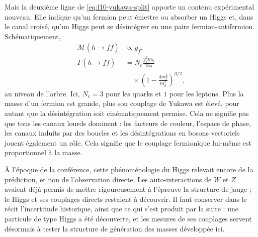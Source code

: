 Mais la deuxième ligne de \eqref{eq:l10-yukawa-split} apporte un contenu expérimental nouveau. Elle indique qu’un fermion peut émettre ou absorber un Higgs et, dans le canal croisé, qu’un Higgs peut se désintégrer en une paire fermion-antifermion. Schématiquement, \begin{equation}
\begin{aligned}
  \mathcal M(h\to f\bar f)&\propto y_f,
  \\
  \Gamma(h\to f\bar f)
  &=
  N_c\frac{y_f^2m_h}{16\pi}
  \\
  &\quad\times
  \left(1-\frac{4m_f^2}{m_h^2}\right)^{3/2},
\end{aligned}
  \label{eq:l10-higgs-fermion-width}
\end{equation} au niveau de l’arbre. Ici, \(N_c=3\) pour les quarks et \(1\) pour les leptons. Plus la masse d’un fermion est grande, plus son couplage de Yukawa est élevé, pour autant que la désintégration soit cinématiquement permise. Cela ne signifie pas que tous les canaux lourds dominent : les facteurs de couleur, l’espace de phase, les canaux induits par des boucles et les désintégrations en bosons vectoriels jouent également un rôle. Cela signifie que le couplage fermionique lui-même est proportionnel à la masse.

\begin{classroomqa}\end{classroomqa}

À l’époque de la conférence, cette phénoménologie du Higgs relevait encore de la prédiction, et non de l’observation directe. Les auto-interactions de \(W\) et \(Z\) avaient déjà permis de mettre rigoureusement à l’épreuve la structure de jauge ; le Higgs et ses couplages directs restaient à découvrir. Il faut conserver dans le récit l’incertitude historique, ainsi que ce qui s’est produit par la suite : une particule de type Higgs a été découverte, et les mesures de ses couplages servent désormais à tester la structure de génération des masses développée ici.

